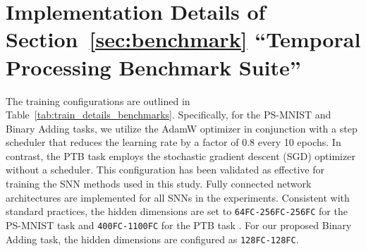 \section{Implementation Details of Section~\ref{sec:benchmark} ``Temporal Processing Benchmark Suite''}
\label{app:imp_det_seq_bench}

The training configurations are outlined in Table~\ref{tab:train_details_benchmarks}. Specifically, for the PS-MNIST and Binary Adding tasks, we utilize the AdamW optimizer \cite{loshchilov2017fixing} in conjunction with a step scheduler that reduces the learning rate by a factor of 0.8 every 10 epochs. In contrast, the PTB task employs the stochastic gradient descent (SGD) optimizer without a scheduler. This configuration has been validated as effective for training the SNN methods used in this study. Fully connected network architectures are implemented for all SNNs in the experiments. Consistent with standard practices, the hidden dimensions are set to \texttt{64FC-256FC-256FC} for the PS-MNIST task \cite{ALIF, TCLIF} and \texttt{400FC-1100FC} for the PTB task \cite{merityRegOpt}. For our proposed Binary Adding task, the hidden dimensions are configured as \texttt{128FC-128FC}. 




